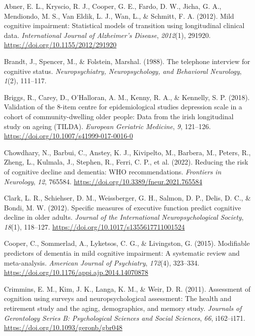 \documentclass[
]{article}
\newlength{\cslhangindent}
\newenvironment{CSLReferences}[2] %
 {\begin{list}{}{%
  \setlength{\itemindent}{0pt}
  \setlength{\leftmargin}{0pt}
  \setlength{\parsep}{0pt}
  \ifodd #1
   \setlength{\leftmargin}{\cslhangindent}
   \setlength{\itemindent}{-1\cslhangindent}
  \fi
  \setlength{\itemsep}{#2\baselineskip}}}
 {\end{list}}
\begin{document}
\label{refs}
\begin{CSLReferences}{1}{0}
Abner, E. L., Kryscio, R. J., Cooper, G. E., Fardo, D. W., Jicha, G. A.,
Mendiondo, M. S., Van Eldik, L. J., Wan, L., \& Schmitt, F. A. (2012).
Mild cognitive impairment: Statistical models of transition using
longitudinal clinical data. \emph{International Journal of Alzheimer's
Disease}, \emph{2012}(1), 291920.
\url{https://doi.org/10.1155/2012/291920}

Brandt, J., Spencer, M., \& Folstein, Marshal. (1988). The telephone
interview for cognitive status. \emph{Neuropsychiatry, Neuropsychology,
and Behavioral Neurology}, \emph{1}(2), 111--117.

Briggs, R., Carey, D., O'Halloran, A. M., Kenny, R. A., \& Kennelly, S.
P. (2018). Validation of the 8-item centre for epidemiological studies
depression scale in a cohort of community-dwelling older people: Data
from the irish longitudinal study on ageing ({TILDA}). \emph{European
Geriatric Medicine}, \emph{9}, 121--126.
\url{https://doi.org/10.1007/s41999-017-0016-0}

Chowdhary, N., Barbui, C., Anstey, K. J., Kivipelto, M., Barbera, M.,
Peters, R., Zheng, L., Kulmala, J., Stephen, R., Ferri, C. P., et al.
(2022). Reducing the risk of cognitive decline and dementia: {WHO}
recommendations. \emph{Frontiers in Neurology}, \emph{12}, 765584.
\url{https://doi.org/10.3389/fneur.2021.765584}

Clark, L. R., Schiehser, D. M., Weissberger, G. H., Salmon, D. P.,
Delis, D. C., \& Bondi, M. W. (2012). Specific measures of executive
function predict cognitive decline in older adults. \emph{Journal of the
International Neuropsychological Society}, \emph{18}(1), 118--127.
\url{https://doi.org/10.1017/s1355617711001524}

Cooper, C., Sommerlad, A., Lyketsos, C. G., \& Livingston, G. (2015).
Modifiable predictors of dementia in mild cognitive impairment: A
systematic review and meta-analysis. \emph{American Journal of
Psychiatry}, \emph{172}(4), 323--334.
\url{https://doi.org/10.1176/appi.ajp.2014.14070878}

Crimmins, E. M., Kim, J. K., Langa, K. M., \& Weir, D. R. (2011).
Assessment of cognition using surveys and neuropsychological assessment:
The health and retirement study and the aging, demographics, and memory
study. \emph{Journals of Gerontology Series B: Psychological Sciences
and Social Sciences}, \emph{66}, i162--i171.
\url{https://doi.org/10.1093/geronb/gbr048}


\end{CSLReferences}
\end{document}
